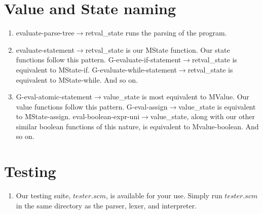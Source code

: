 \documentclass{article}
\begin{document}
\section{Value and State naming}
\begin{enumerate}
    \item evaluate-parse-tree$\rightarrow$retval\_state runs the parsing of the program. 
    
    \item evaluate-statement$\rightarrow$retval\_state is our MState function. Our state functions follow this pattern. G-evaluate-if-statement$\rightarrow$retval\_state is equivalent to MState-if. G-evaluate-while-statement$\rightarrow$retval\_state is equivalent to MState-while. And so on.
    
    \item G-eval-atomic-statement$\rightarrow$value\_state is most equivalent to MValue. Our value functions follow this pattern. G-eval-assign$\rightarrow$value\_state is equivalent to MState-assign. eval-boolean-expr-uni$\rightarrow$value\_state, along with our other similar boolean functions of this nature, is equivalent to Mvalue-boolean. And so on.
\end{enumerate}

\section{Testing}
\begin{enumerate}
\item Our testing suite, $tester.scm$, is available for your use. Simply run $tester.scm$ in the same directory as the parser, lexer, and interpreter.
\end{enumerate}
\end{document}
